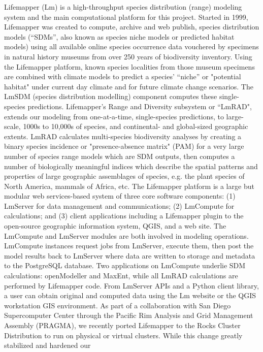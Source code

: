 Lifemapper (Lm) is a high-throughput species distribution (range)
modeling system and the main computational platform for this project.
Started in 1999, Lifemapper was created to compute, archive and web
publish, species distribution models (``SDMs'', also known as species
niche models or predicted habitat models) using all available online
species occurrence data vouchered by specimens in natural history
museums from over 250 years of biodiversity inventory. Using the
Lifemapper platform, known species localities from those museum
specimens are combined with climate models to predict a species'
``niche'' or "potential habitat" under current day climate and for
future climate change scenarios. The LmSDM (species distribution
modelling) component computes these single-species predictions.
Lifemapper's Range and Diversity subsystem or ``LmRAD", extends our
modeling from one-at-a-time, single-species predictions, to large-scale,
1000s to 10,000s of species, and continental- and global-sized
geographic extents. LmRAD calculates multi-species biodiversity analyses
by creating a binary species incidence or "presence-absence matrix"
(PAM) for a very large number of species range models which are SDM
outputs, then computes a number of biologically meaningful indices which
describe the spatial patterns and properties of large geographic
assemblages of species, e.g. the plant species of North America, mammals
of Africa, etc. The Lifemapper platform is a large but modular web
services-based system of three core software components: (1) LmServer
for data management and communications; (2) LmCompute for calculations;
and (3) client applications including a Lifemapper plugin to the
open-source geographic information system, QGIS, and a web site. The
LmCompute and LmServer modules are both involved in modeling operations.
LmCompute instances request jobs from LmServer, execute them, then post
the model results back to LmServer where data are written to storage and
metadata to the PostgreSQL database. Two applications on LmCompute
underlie SDM calculations: openModeller and MaxEnt, while all LmRAD
calculations are performed by Lifemapper code. From LmServer APIs and a
Python client library, a user can obtain original and computed data
using the Lm website or the QGIS workstation GIS environment. As part of
a collaboration with San Diego Supercomputer Center through the Pacific
Rim Analysis and Grid Management Assembly (PRAGMA), we recently ported
Lifemapper to the Rocks Cluster Distribution to run on physical or
virtual clusters. While this change greatly stabilized and hardened our
